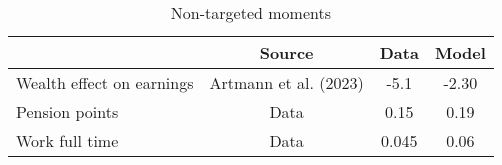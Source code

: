 \begin{table}[htbp]\caption{Non-targeted moments}\label{table:nontargeted_moments}\centering\footnotesize\begin{tabular}{lccc} \toprule  &  Source& Data & Model  \\\midrule    Wealth effect on earnings      & Artmann et al. (2023)          & -5.1 &-2.30\\ Pension points                & Data                           & 0.15 &0.19\\ Work full time              & Data                             & 0.045 &0.06\\  \bottomrule\end{tabular}\end{table}
